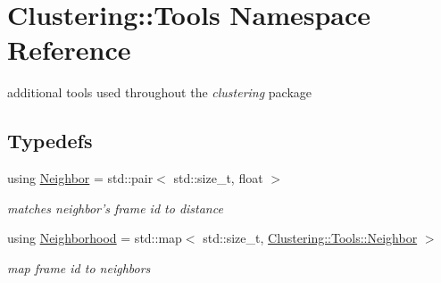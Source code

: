 \hypertarget{namespaceClustering_1_1Tools}{\section{Clustering\-:\-:Tools Namespace Reference}
\label{namespaceClustering_1_1Tools}
}


additional tools used throughout the {\itshape clustering} package  


\subsection*{Typedefs}
\begin{DoxyCompactItemize}
\item 
\hypertarget{namespaceClustering_1_1Tools_a63a5e933e8b64deefbb1128bbbdc3dd1}{using \hyperlink{namespaceClustering_1_1Tools_a63a5e933e8b64deefbb1128bbbdc3dd1}{Neighbor} = std\-::pair$<$ std\-::size\-\_\-t, float $>$}\label{namespaceClustering_1_1Tools_a63a5e933e8b64deefbb1128bbbdc3dd1}

\begin{DoxyCompactList}\small\item\em matches neighbor's frame id to distance \end{DoxyCompactList}\item 
\hypertarget{namespaceClustering_1_1Tools_ad2b6f4886446247db27ece196d76575c}{using \hyperlink{namespaceClustering_1_1Tools_ad2b6f4886446247db27ece196d76575c}{Neighborhood} = std\-::map$<$ std\-::size\-\_\-t, \hyperlink{namespaceClustering_1_1Tools_a63a5e933e8b64deefbb1128bbbdc3dd1}{Clustering\-::\-Tools\-::\-Neighbor} $>$}\label{namespaceClustering_1_1Tools_ad2b6f4886446247db27ece196d76575c}

\begin{DoxyCompactList}\small\item\em map frame id to neighbors \end{DoxyCompactList}\end{DoxyCompactItemize}
